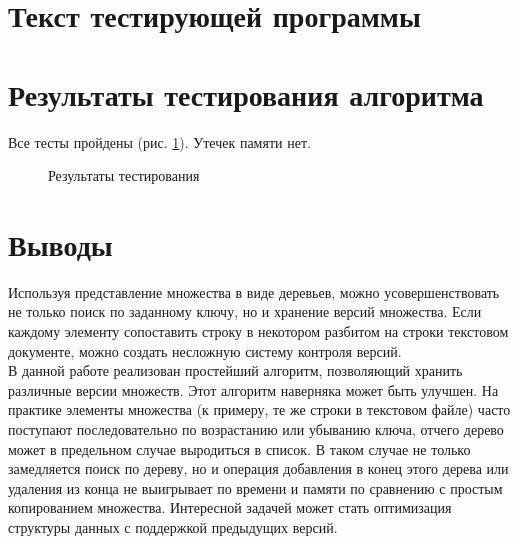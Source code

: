 \documentclass[zuev-23631-2-report.tex]{subfiles}
\begin{document}
\section{Текст тестирующей программы}

\newpage
\section{Результаты тестирования алгоритма}
Все тесты пройдены (рис. \ref{testPict}). Утечек памяти нет.
\begin{figure}[H]
\caption{Результаты тестирования}
\label{testPict}
\end{figure}

\newpage
\section{Выводы}
Используя представление множества в виде деревьев, можно усовершенствовать не только поиск по заданному ключу, но и хранение версий множества. Если каждому элементу сопоставить строку в некотором разбитом на строки текстовом документе, можно создать несложную систему контроля версий.\\
В данной работе реализован простейший алгоритм, позволяющий хранить различные версии множеств. Этот алгоритм наверняка может быть улучшен. На практике элементы множества (к примеру, те же строки в текстовом файле) часто поступают последовательно по возрастанию или убыванию ключа, отчего дерево может в предельном случае выродиться в список. В таком случае не только замедляется поиск по дереву, но и операция добавления в конец этого дерева или удаления из конца не выигрывает по времени и памяти по сравнению с простым копированием множества. Интересной задачей может стать оптимизация структуры данных с поддержкой предыдущих версий.\\
\end{document}
